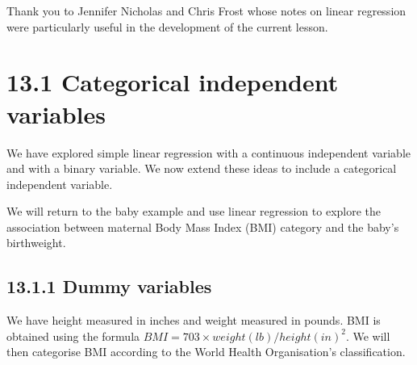 \documentclass[letterpaper,10pt,english]{jupyterBook}
\begin{document}
\sphinxAtStartPar
{}  Thank you to Jennifer Nicholas and Chris Frost whose notes on linear regression were particularly useful in the development of the current lesson.


\section{13.1 Categorical independent variables}
\label{\detokenize{13.b. Linear Regression II:categorical-independent-variables}}\label{\detokenize{13.b. Linear Regression II::doc}}
\sphinxAtStartPar
We have explored simple linear regression with a continuous independent variable and with a binary variable. We now extend these ideas to include a categorical independent variable.

\sphinxAtStartPar
We will return to the baby example and use linear regression to explore the association between maternal Body Mass Index (BMI) category and the baby’s birthweight.


\subsection{13.1.1 Dummy variables}
\label{\detokenize{13.b. Linear Regression II:dummy-variables}}
\sphinxAtStartPar
We have height measured in inches and weight measured in pounds. BMI is obtained using the formula \(BMI = 703 \times weight (lb) / height (in)^2\). We will then categorise BMI according to the World Health Organisation’s classification.
\end{document}
